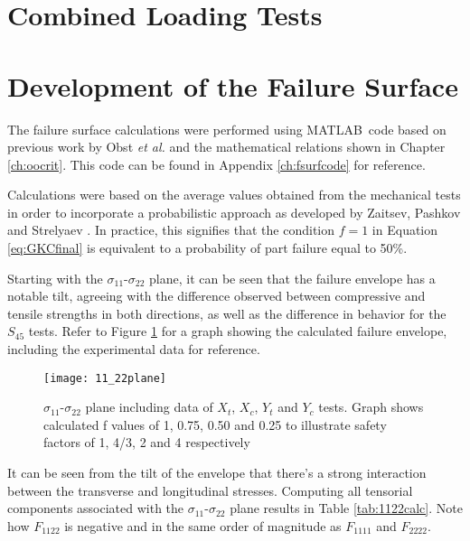 \documentclass[main.tex]{subfiles}
\begin{document}
\section{Combined Loading Tests} \label{sec:clr}
\section{Development of the Failure Surface} \label{sec:fsc}

The failure surface calculations were performed using MATLAB\textregistered~code based on previous work by Obst \emph{et al.} \cite{Obst2018} and the mathematical relations shown in Chapter \ref{ch:oocrit}. This code can be found in Appendix \ref{ch:fsurfcode} for reference.

Calculations were based on the average values obtained from the mechanical tests in order to incorporate a probabilistic approach as developed by Zaitsev, Pashkov and Strelyaev \cite{Zaitsev1975}. In practice, this signifies that the condition $f=1$ in Equation \ref{eq:GKCfinal} is equivalent to a probability of part failure equal to 50\%.

Starting with the $\sigma_{11}$-$\sigma_{22}$ plane, it can be seen that the failure envelope has a notable tilt, agreeing with the difference observed between compressive and tensile strengths in both directions, as well as the difference in behavior for the $S_{45}$ tests. Refer to Figure \ref{fig:1122plane} for a graph showing the calculated failure envelope, including the experimental data for reference.

\begin{figure}[!htbp]
	\center
	\texttt{[image: 11\_22plane]}
	\captionsetup{justification=centering} %
	\caption[failure envelope in the $\sigma_{11}$-$\sigma_{22}$ plane]{$\sigma_{11}$-$\sigma_{22}$ plane including data of $X_t$, $X_c$, $Y_t$ and $Y_c$ tests. Graph shows calculated f values of 1, 0.75, 0.50 and 0.25 to illustrate safety factors of 1, 4/3, 2 and 4 respectively} \label{fig:1122plane}
\end{figure}

It can be seen from the tilt of the envelope that there's a strong interaction between the transverse and longitudinal stresses. Computing all tensorial components associated with the  $\sigma_{11}$-$\sigma_{22}$ plane results in Table \ref{tab:1122calc}. Note how $F_{1122}$ is negative and in the same order of magnitude as $F_{1111}$ and $F_{2222}$. 
\end{document}
